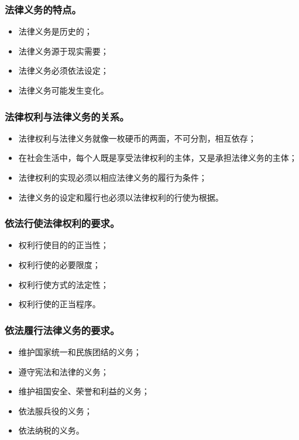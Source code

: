 \documentclass{article}
\begin{document}
\subsubsection{法律义务的特点。}
\begin{itemize}
    \item 法律义务是历史的；
    \item 法律义务源于现实需要；
    \item 法律义务必须依法设定；
    \item 法律义务可能发生变化。
\end{itemize}

\subsubsection{法律权利与法律义务的关系。}
\begin{itemize}
    \item 法律权利与法律义务就像一枚硬币的两面，不可分割，相互依存；
    \item 在社会生活中，每个人既是享受法律权利的主体，又是承担法律义务的主体；
    \item 法律权利的实现必须以相应法律义务的履行为条件；
    \item 法律义务的设定和履行也必须以法律权利的行使为根据。
\end{itemize}

\subsubsection{依法行使法律权利的要求。}
\begin{itemize}
    \item 权利行使目的的正当性；
    \item 权利行使的必要限度；
    \item 权利行使方式的法定性；
    \item 权利行使的正当程序。
\end{itemize}

\subsubsection{依法履行法律义务的要求。}
\begin{itemize}
    \item 维护国家统一和民族团结的义务；
    \item 遵守宪法和法律的义务；
    \item 维护祖国安全、荣誉和利益的义务；
    \item 依法服兵役的义务；
    \item 依法纳税的义务。
\end{itemize}
\end{document}
